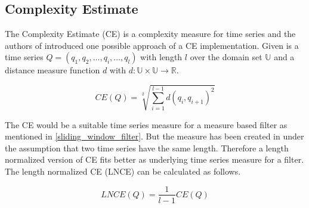 \subsection{Complexity Estimate} \label{complexity_estimate}
The Complexity Estimate (CE) is a complexity measure for time series and the authors of \cite{batista2011complexity}
introduced one possible approach of a CE implementation. Given is a time series $Q = (q_1, q_2, \dots, q_i, \dots, q_l)$
with length $l$ over the domain set $\mathbb{U}$ and a distance measure function $d$ with
$d: \mathbb{U} \times \mathbb{U} \to \mathbb{R}$.

\begin{equation}
    CE(Q) = \sqrt[2]{\sum \limits_{i=1}^{l-1} d(q_i, q_{i + 1})^2}
\end{equation}

The CE would be a suitable time series measure for a measure based filter as mentioned in \ref{sliding_window_filter}.
But the measure has been created in \cite{batista2011complexity} under the assumption that two time series have the same
length. Therefore a length normalized version of CE fits better as underlying time series measure for a filter. The
length normalized CE (LNCE) can be calculated as follows.

\begin{equation}
    LNCE(Q) = \frac{1}{l-1}CE(Q)
\end{equation}
